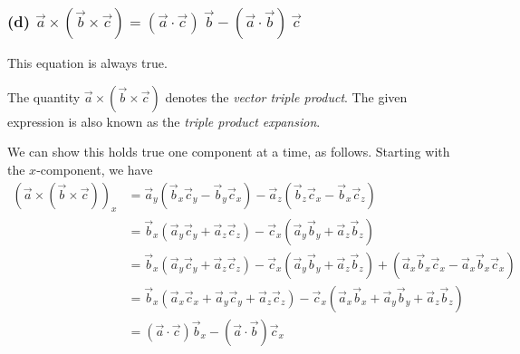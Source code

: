 \subsubsection*{(d) \( \vec{a} \times (\vec{b} \times \vec{c}) = (\vec{a} \cdot \vec{c})\ \vec{b} - (\vec{a} \cdot \vec{b})\ \vec{c} \)}

This equation is always true.

The quantity \( \vec{a} \times (\vec{b} \times \vec{c}) \) denotes the \textit{vector triple product}.
The given expression is also known as the \textit{triple product expansion}.

We can show this holds true one component at a time, as follows.
Starting with the \( x \)-component, we have
\begin{equation*}
    \begin{aligned}
        {(\vec{a} \times (\vec{b} \times \vec{c} ))}_{x}
         & = \vec{a} _{y}(\vec{b} _{x}\vec{c} _{y}-\vec{b} _{y}\vec{c} _{x})-\vec{a} _{z}(\vec{b} _{z}\vec{c} _{x}-\vec{b} _{x}\vec{c} _{z})
        \\ & = \vec{b} _{x}(\vec{a} _{y}\vec{c} _{y}+\vec{a} _{z}\vec{c} _{z})-\vec{c} _{x}(\vec{a} _{y}\vec{b} _{y}+\vec{a} _{z}\vec{b} _{z})
        \\ & = \vec{b} _{x}(\vec{a} _{y}\vec{c} _{y}+\vec{a} _{z}\vec{c} _{z})-\vec{c} _{x}(\vec{a} _{y}\vec{b} _{y}+\vec{a} _{z}\vec{b} _{z})+(\vec{a} _{x}\vec{b} _{x}\vec{c} _{x}-\vec{a} _{x}\vec{b} _{x}\vec{c} _{x})
        \\ & = \vec{b} _{x}(\vec{a} _{x}\vec{c} _{x}+\vec{a} _{y}\vec{c} _{y}+\vec{a} _{z}\vec{c} _{z})-\vec{c} _{x}(\vec{a} _{x}\vec{b} _{x}+\vec{a} _{y}\vec{b} _{y}+\vec{a} _{z}\vec{b} _{z})
        \\ & = (\vec{a} \cdot \vec{c} )\vec{b} _{x}-(\vec{a} \cdot \vec{b} )\vec{c} _{x}
    \end{aligned}
\end{equation*}
